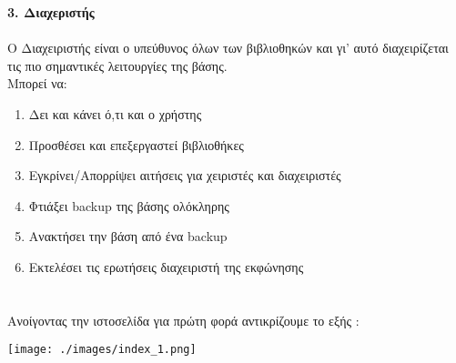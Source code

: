\documentclass[14pt]{report}
\begin{document}
	\newpage
	\hypertarget{adminanchor}{}
	\textbf{3. Διαχεριστής} \\ \\
	Ο Διαχειριστής είναι ο υπεύθυνος όλων των βιβλιοθηκών και γι' αυτό διαχειρίζεται τις πιο σημαντικές λειτουργίες της βάσης. \\
	Μπορεί να:
	\begin{enumerate}[label=\alph*)]
		\item Δει και κάνει ό,τι και ο χρήστης
		\item Προσθέσει και επεξεργαστεί βιβλιοθήκες
		\item Εγκρίνει/Απορρίψει αιτήσεις για χειριστές και διαχειριστές
		\item Φτιάξει \textlatin{backup} της βάσης ολόκληρης
		\item Ανακτήσει την βάση από ένα \textlatin{backup}
		\item Εκτελέσει τις ερωτήσεις διαχειριστή της εκφώνησης
	\end{enumerate}

	\newpage
	\hypertarget{Homepage}{}
	\chapter*{\Large {}}
	Ανοίγοντας την ιστοσελίδα για πρώτη φορά αντικρίζουμε το εξής  : \\
	\begin{center}
		\texttt{[image: ./images/index\_1.png]} %
		\par\vspace{2cm} %
	\end{center}
\end{document}
